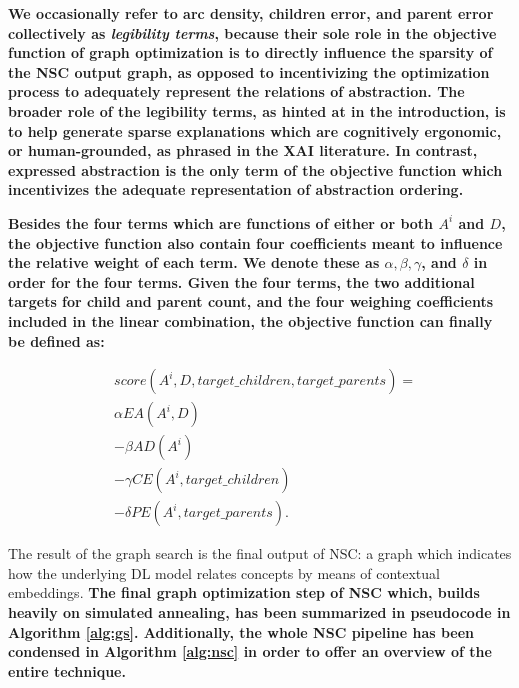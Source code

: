 \textbf{We occasionally refer to arc density, children error, and parent error collectively as \textit{legibility terms}, because their sole role in the objective function of graph optimization is to directly influence the sparsity of the NSC output graph, as opposed to incentivizing the optimization process to adequately represent the relations of abstraction. The broader role of the legibility terms, as hinted at in the introduction, is to help generate sparse explanations which are cognitively ergonomic, or human-grounded, as phrased in the XAI literature. In contrast, expressed abstraction is the only term of the objective function which incentivizes the adequate representation of abstraction ordering.}

\textbf{Besides the four terms which are functions of either or both $A^i$ and $D$, the objective function also contain four coefficients meant to influence the relative weight of each term. We denote these as $\alpha, \beta, \gamma$, and $\delta$ in order for the four terms. Given the four terms, the two additional targets for child and parent count, and the four weighing coefficients included in the linear combination, the objective function can finally be defined as:}

\begin{align*}
     & score(A^i, D, target\_children, target\_parents) = \\
     & \alpha EA(A^i, D)                                  \\
     & - \beta AD(A^i)                                    \\
     & - \gamma CE(A^i, target\_children)                 \\
     & - \delta PE(A^i, target\_parents).
\end{align*}

The result of the graph search is the final output of NSC: a graph which indicates how the underlying DL model relates concepts by means of contextual embeddings. \textbf{The final graph optimization step of NSC which, builds heavily on simulated annealing, has been summarized in pseudocode in Algorithm \ref{alg:gs}. Additionally, the whole NSC pipeline has been condensed in Algorithm \ref{alg:nsc} in order to offer an overview of the entire technique.}

